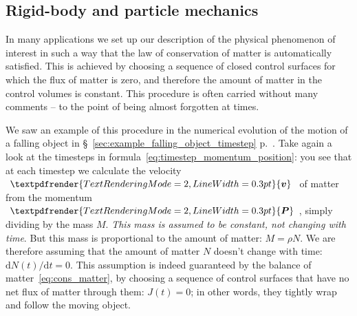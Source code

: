 \documentclass[a4paper,12pt,%
onecolumn,oneside,titlepage,%
british%
]{memoir}
\renewcommand*{\bm}[1]{\textpdfrender{TextRenderingMode=2,LineWidth=0.3pt}{\boldsymbol{#1}}}
\newcommand*{\di}{\mathrm{d}}%
\renewcommand*{\|}[1][]{\nonscript\:#1\vert\nonscript\:\mathopen{}}
\newcommand*{\sect}{\S}%
\newcommand*{\yv}{\bm{v}}
\newcommand*{\yN}{N}
\newcommand*{\yJ}{J}
\newcommand*{\yrho}{\rho}
\newcommand*{\yM}{M}%
\newcommand*{\yP}{\bm{P}}
\begin{document}
\subsection{Rigid-body and particle mechanics}
\label{sec:cons_matter_particle}

In many applications we set up our description of the physical phenomenon of interest in such a way that the law of conservation of matter is automatically satisfied. This is achieved by choosing a sequence of closed control surfaces for which the flux of matter is zero, and therefore the amount of matter in the control volumes is constant. This procedure is often carried without many comments -- to the point of being almost forgotten at times.

We saw an example of this procedure in the numerical evolution of the motion of a falling object in \sect~\ref{sec:example_falling_object_timestep} p.~\pageref{sec:example_falling_object_timestep}.
%
Take again a look at the timesteps in formula~\eqref{eq:timestep_momentum_position}: you see that at each timestep we calculate the velocity $\yv$ of matter from the momentum $\yP$, simply dividing by the mass $\yM$. \emph{This mass is assumed to be constant, not changing with time}. But this mass is proportional to the amount of matter: $\yM = \yrho \yN$. We are therefore assuming that the amount of matter $\yN$ doesn't change with time: $\di\yN(t)/\di t = 0$. This assumption is indeed guaranteed by the balance of matter~\eqref{eq:cons_matter}, by choosing a sequence of control surfaces that have no net flux of matter through them: $\yJ(t)=0$; in other words, they tightly wrap and follow the moving object.
\end{document}
